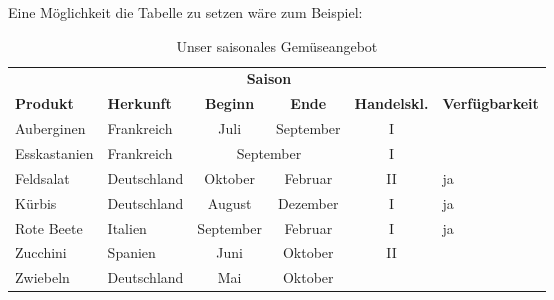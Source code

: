 % 

Eine Möglichkeit die Tabelle zu setzen wäre zum Beispiel:

\begin{LTXexample}[pos=b]
\begin{table}
  \centering
  \begin{tabular}{llcccl}
    \toprule
    && \multicolumn{2}{c}{\textbf{Saison}} \\
    \cmidrule{3-4}
    \textbf{Produkt} & \textbf{Herkunft} & \textbf{Beginn} & \textbf{Ende} & \textbf{Handelskl.} & \textbf{Verfügbarkeit}\\
    \midrule
    Auberginen & Frankreich & Juli & September & I &  \\
    Esskastanien & Frankreich & \multicolumn{2}{c}{September} & I &  \\
    Feldsalat & Deutschland & Oktober & Februar & II & ja \\
    Kürbis & Deutschland & August & Dezember & I & ja\\
    Rote Beete & Italien & September & Februar & I  & ja\\
    Zucchini & Spanien & Juni & Oktober & II &  \\
    Zwiebeln & Deutschland & Mai & Oktober &  & \\
    \bottomrule
  \end{tabular}
  \caption{Unser saisonales Gemüseangebot}
\end{table}
\end{LTXexample}